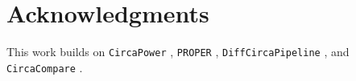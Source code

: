 \documentclass{article}
\newcommand{\software}[1]{\texttt{#1}}
\begin{document}

\section*{Acknowledgments}

This work builds on \software{CircaPower} \cite{zong2023circapower}, \software{PROPER} \cite{wu2015proper}, \software{DiffCircaPipeline} \cite{xue2023diffcircapipeline}, and \software{CircaCompare} \cite{parsons2020circacompare}.



\end{document}
